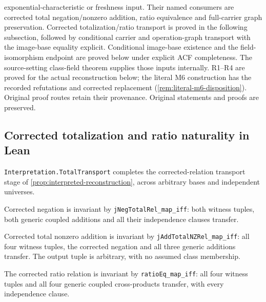 \documentclass[11pt,oneside]{article}
\theoremstyle{definition}
\theoremstyle{remark}
\newcommand{\lean}[1]{\nolinkurl{#1}}
\begin{document}
exponential-characteristic or freshness input. Their named consumers are corrected
total negation/nonzero addition, ratio equivalence and full-carrier graph preservation.
Corrected totalization/ratio transport is proved in the following subsection, followed
by conditional carrier and operation-graph transport with the image-base equality explicit.
Conditional image-base existence and the field-isomorphism endpoint are proved below under
explicit ACF completeness. The source-setting class-field theorem supplies those inputs
internally. R1--R4 are proved for the actual reconstruction below; the literal M6
construction has the recorded refutations and corrected replacement
(\cref{rem:literal-m6-disposition}). Original proof routes retain their provenance.
Original statements and proofs are preserved.

\subsection{Corrected totalization and ratio naturality in Lean}

\lean{Interpretation.TotalTransport} completes the corrected-relation transport stage of
\cref{prop:interpreted-reconstruction}, across arbitrary bases and independent universes.

Corrected negation is invariant by \lean{jNegTotalRel_map_iff}: both witness tuples,
both generic coupled additions and all their independence clauses transfer.

Corrected total nonzero addition is invariant by \lean{jAddTotalNZRel_map_iff}: all four
witness tuples, the corrected negation and all three generic additions transfer.
The output tuple is arbitrary, with no assumed class membership.

The corrected ratio relation is invariant by \lean{ratioEq_map_iff}: all four witness
tuples and all four generic coupled cross-products transfer, with every independence clause.
\end{document}
